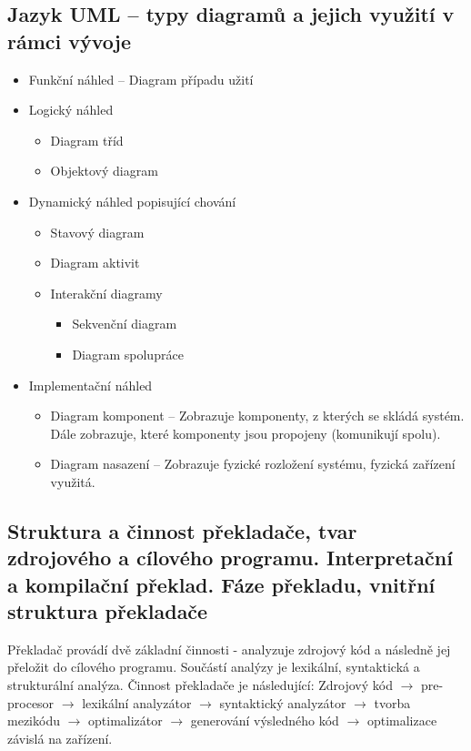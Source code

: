 \subsection{Jazyk UML – typy diagramů a jejich využití v rámci vývoje}
\begin{itemize}
\item Funkční náhled -- Diagram případu užití
\item Logický náhled
	\begin{itemize}
	\item Diagram tříd
	\item Objektový diagram
	\end{itemize}
\item Dynamický náhled popisující chování
	\begin{itemize}
	\item Stavový diagram
	\item Diagram aktivit
	\item Interakční diagramy 	\begin{itemize}
									\item Sekvenční diagram
									\item Diagram spolupráce
								\end{itemize}
	\end{itemize}
\item Implementační náhled
	\begin{itemize}
	\item Diagram komponent -- Zobrazuje komponenty, z kterých se skládá systém. Dále zobrazuje, které komponenty jsou propojeny (komunikují spolu).
	\item Diagram nasazení -- Zobrazuje fyzické rozložení systému, fyzická zařízení využitá.
	\end{itemize}
\end{itemize}
\subsection[Překladač, Kompiler]{Struktura a činnost překladače, tvar zdrojového a cílového programu. Interpretační a kompilační překlad. Fáze překladu, vnitřní struktura překladače}
Překladač provádí dvě základní činnosti - analyzuje zdrojový kód a následně jej přeložit do cílového programu. Součástí analýzy je lexikální, syntaktická a strukturální analýza. Činnost překladače je následující: 
Zdrojový kód $\rightarrow$ pre-procesor $\rightarrow$ lexikální analyzátor $\rightarrow$ syntaktický analyzátor $\rightarrow$ tvorba mezikódu $\rightarrow$ optimalizátor $\rightarrow$ generování výsledného kód $\rightarrow$ optimalizace závislá na zařízení.

